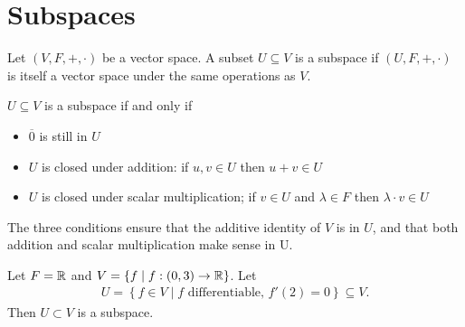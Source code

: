 \documentclass{memoir}
\begin{document}


\section{Subspaces}
\begin{defn}[Subspace]	
Let $(V,F,+,\cdot )$ be a vector space. A subset $U \subseteq V$ is a subspace if $(U,F,+,\cdot )$ is itself a vector space under the same operations as \(V\).
\end{defn}

\begin{lemma}
 $U \subseteq V$ is a subspace if and only if
\begin{itemize}
	\item $\overline{0}$ is still in $U$
	\item  $U$ is closed under addition: if $u,v \in U$ then $u+v \in U$
	\item $U$ is closed under scalar multiplication;  if $v \in U$ and $\lambda \in F$ then $\lambda \cdot v \in U$
\end{itemize}
\end{lemma}
The three conditions ensure that the additive identity of $V$ is in $U$, and that both addition and scalar multiplication make sense in U.


\begin{exmp}
Let $F = \mathbb{R}$ and $ V = \left\{f \mid  f:(0,3)\to \mathbb{R} \right\} $. Let
\begin{align*}
U = \left\{ f \in V \mid f \text{ differentiable, } f'(2) = 0 \right\} \subseteq V .
\end{align*}
Then \(U\subset V\) is a subspace.
\end{exmp}
\end{document}
